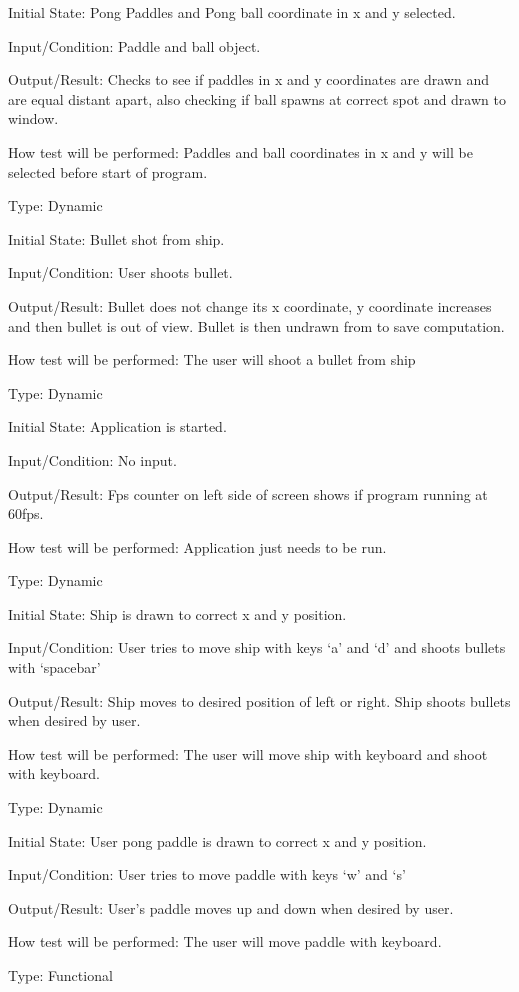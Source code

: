 \documentclass[12pt, titlepage]{article}
\begin{document}
Initial State: Pong Paddles and Pong ball coordinate in x and y selected.

Input/Condition: Paddle and ball object.

Output/Result: Checks to see if paddles in x and y coordinates are drawn and are equal distant apart, also checking if ball spawns at correct spot and drawn to window.

How test will be performed: Paddles and ball coordinates in x and y will be selected before start of program.


Type: Dynamic

Initial State: Bullet shot from ship.

Input/Condition: User shoots bullet.

Output/Result: Bullet does not change its x coordinate, y coordinate increases and then bullet is out of view. Bullet is then undrawn from to save computation.

How test will be performed: The user will shoot a bullet from ship


Type: Dynamic

Initial State: Application is started.

Input/Condition: No input.

Output/Result: Fps counter on left side of screen shows if program running at 60fps.

How test will be performed: Application just needs to be run.


Type: Dynamic

Initial State: Ship is drawn to correct x and y position.

Input/Condition: User tries to move ship with keys ‘a’ and ‘d’ and shoots bullets with ‘spacebar’

Output/Result: Ship moves to desired position of left or right. Ship shoots bullets when desired by user. 

How test will be performed: The user will move ship with keyboard and shoot with keyboard.


Type: Dynamic

Initial State: User pong paddle is drawn to correct x and y position.

Input/Condition: User tries to move paddle with keys ‘w’ and ‘s’ 

Output/Result: User’s paddle moves up and down when desired by user.

How test will be performed: The user will move paddle with keyboard.


Type: Functional
\end{document}
